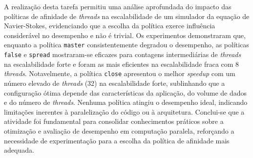 \documentclass[a4paper, 12pt]{article}
\begin{document}
	\hspace{0.62cm}A realização desta tarefa permitiu uma análise aprofundada do impacto das políticas de afinidade de \textit{threads} na escalabilidade de um simulador da equação de Navier-Stokes, evidenciando que a escolha da política exerce influência considerável no desempenho e não é trivial. Os experimentos demonstraram que, enquanto a política \texttt{master} consistentemente degradou o desempenho, as políticas \texttt{false} e \texttt{spread} mostraram-se eficazes para contagens intermediárias de \textit{threads} na escalabilidade forte e foram as mais eficientes na escalabilidade fraca com 8 \textit{threads}. Notavelmente, a política \texttt{close} apresentou o melhor \textit{speedup} com um número elevado de \textit{threads} (32) na escalabilidade forte, sublinhando que a configuração ótima depende das características da aplicação, do volume de dados e do número de \textit{threads}. Nenhuma política atingiu o desempenho ideal, indicando limitações inerentes à paralelização do código ou à arquitetura. Conclui-se que a atividade foi fundamental para consolidar conhecimentos práticos sobre a otimização e avaliação de desempenho em computação paralela, reforçando a necessidade de experimentação para a escolha da política de afinidade mais adequada.
	
	

	 
\end{document}
